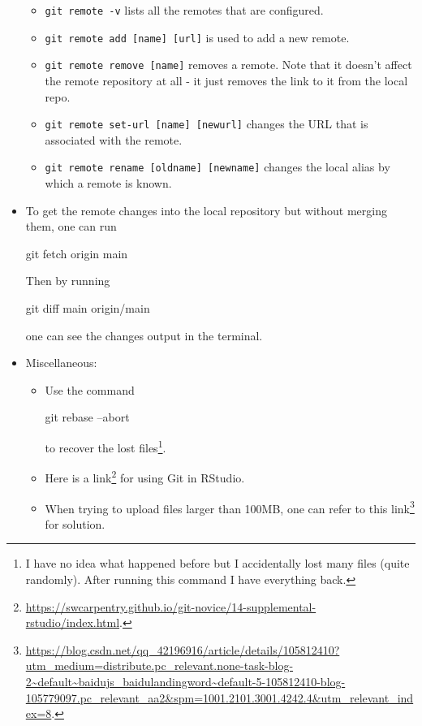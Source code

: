 \documentclass[UTF8]{book}
\newcommand{\code}[1]{\colorbox{codegray}{\texttt{#1}}}
\begin{document}
\begin{itemize}
\begin{itemize}
	\item \code{git remote -v} lists all the remotes that are configured.
	\item \code{git remote add [name] [url]} is used to add a new remote.
	\item \code{git remote remove [name]} removes a remote. Note that it doesn't affect the remote repository at all - it just removes the link to it from the local repo.
	\item \code{git remote set-url [name] [newurl]} changes the URL that is associated with the remote.
	\item \code{git remote rename [oldname] [newname]} changes the local alias by which a remote is known.
\end{itemize}
\item To get the remote changes into the local repository but without merging them, one can run
\begin{bash}
git fetch origin main
\end{bash}
Then by running
\begin{bash}
git diff main origin/main
\end{bash}
one can see the changes output in the terminal.
\item Miscellaneous:
\begin{itemize}
\item Use the command
\begin{bash}
git rebase --abort
\end{bash}
to recover the lost files\footnote{I have no idea what happened before but I accidentally lost many files (quite randomly). After running this command I have everything back.}.
\item Here is a link\footnote{\url{https://swcarpentry.github.io/git-novice/14-supplemental-rstudio/index.html}.} for using Git in RStudio.
\item When trying to upload files larger than 100MB, one can refer to this link\footnote{\url{https://blog.csdn.net/qq\_42196916/article/details/105812410?utm\_medium=distribute.pc\_relevant.none-task-blog-2~default~baidujs\_baidulandingword~default-5-105812410-blog-105779097.pc\_relevant\_aa2&spm=1001.2101.3001.4242.4&utm\_relevant\_index=8}.} for solution.
\end{itemize}
\end{itemize}
\end{document}
